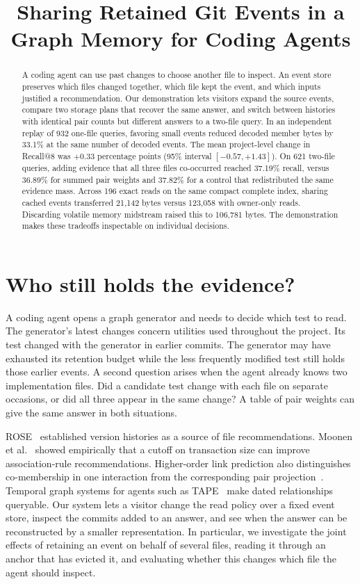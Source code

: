 \documentclass[conference]{IEEEtran}
\title{Sharing Retained Git Events in a Graph Memory for Coding Agents}
\author{\IEEEauthorblockN{Anonymous working draft}}
\begin{document}
\maketitle
\begin{abstract}
A coding agent can use past changes to choose another file to inspect. An event store preserves which files changed together, which file kept the event, and which inputs justified a recommendation. Our demonstration lets visitors expand the source events, compare two storage plans that recover the same answer, and switch between histories with identical pair counts but different answers to a two-file query. In an independent replay of 932 one-file queries, favoring small events reduced decoded member bytes by 33.1\% at the same number of decoded events. The mean project-level change in Recall@8 was $+0.33$ percentage points (95\% interval $[-0.57,+1.43]$). On 621 two-file queries, adding evidence that all three files co-occurred reached 37.19\% recall, versus 36.89\% for summed pair weights and 37.82\% for a control that redistributed the same evidence mass. Across 196 exact reads on the same compact complete index, sharing cached events transferred 21,142 bytes versus 123,058 with owner-only reads. Discarding volatile memory midstream raised this to 106,781 bytes. The demonstration makes these tradeoffs inspectable on individual decisions.
\end{abstract}

\section{Who still holds the evidence?}
A coding agent opens a graph generator and needs to decide which test to read. The generator's latest changes concern utilities used throughout the project. Its test changed with the generator in earlier commits. The generator may have exhausted its retention budget while the less frequently modified test still holds those earlier events. A second question arises when the agent already knows two implementation files. Did a candidate test change with each file on separate occasions, or did all three appear in the same change? A table of pair weights can give the same answer in both situations.

ROSE~\cite{zimmermann} established version histories as a source of file recommendations. Moonen et al.~\cite{moonen} showed empirically that a cutoff on transaction size can improve association-rule recommendations. Higher-order link prediction also distinguishes co-membership in one interaction from the corresponding pair projection~\cite{benson}. Temporal graph systems for agents such as TAPE~\cite{tape} make dated relationships queryable. Our system lets a visitor change the read policy over a fixed event store, inspect the commits added to an answer, and see when the answer can be reconstructed by a smaller representation. In particular, we investigate the joint effects of retaining an event on behalf of several files, reading it through an anchor that has evicted it, and evaluating whether this changes which file the agent should inspect.
\end{document}
